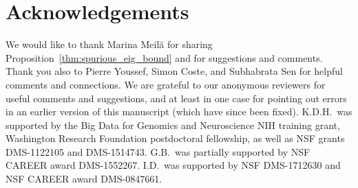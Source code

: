 \documentclass[11pt,letterpaper]{amsart}
\newcommand{\1}{\mathbf{1}}
\newcommand{\0}{\mathbf{0}} %
\newcommand{\2}{two-path}
\begin{document}
\section*{Acknowledgements}

We would like to thank Marina Meil\u{a} for sharing 
Proposition~\ref{thm:spurious_eig_bound} and for suggestions and comments.
Thank you also to Pierre Youssef, Simon Coste, and Subhabrata Sen for 
helpful comments and connections.
We are grateful to our anonymous reviewers for useful comments and suggestions, and at least in one case for pointing out errors 
in an earlier version of this manuscript (which have since been fixed).
K.D.H.\ was supported by the Big Data for Genomics and Neuroscience
NIH training grant, 
Washington Research Foundation postdoctoral fellowship,
as well as NSF grants DMS-1122105 and DMS-1514743.
G.B.\ was partially supported by NSF CAREER award DMS-1552267.
I.D.\ was supported by NSF DMS-1712630 and NSF CAREER award DMS-0847661.


\appendix





\end{document}
